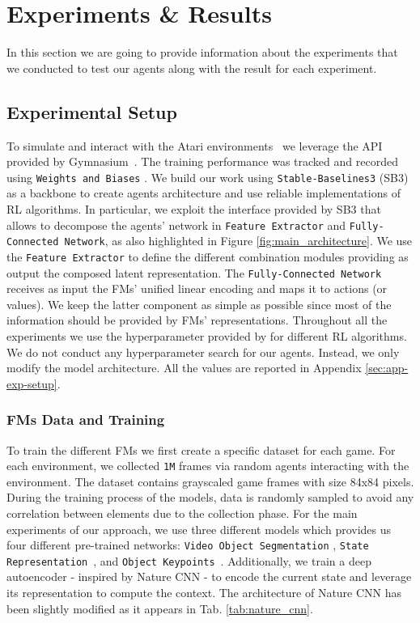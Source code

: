 
\chapter{Experiments \& Results}
\label{ch:experiments_and_results}
In this section we are going to provide information about the experiments that we conducted to test our agents along with the result for each experiment.


\section{Experimental Setup}\label{sec:exp_setup}
To simulate and interact with the Atari environments~\citep{bellemare2013atari} we leverage the API provided by Gymnasium~\citep{towers_gymnasium_2023}.
The training performance was tracked and recorded using \texttt{Weights and Biases} \citep{wandb}.
We build our work using \texttt{Stable-Baselines3} (SB3) \citep{stable-baselines3} as a backbone to create agents architecture and use reliable implementations of RL algorithms.
In particular, we exploit the interface provided by SB3 that allows to decompose the agents' network in \texttt{Feature Extractor} and \texttt{Fully-Connected Network}, as also highlighted in Figure \ref{fig:main_architecture}.
We use the \texttt{Feature Extractor} to define the different combination modules providing as output the composed latent representation.
The \texttt{Fully-Connected Network} receives as input the FMs' unified linear encoding and maps it to actions (or values).
We keep the latter component as simple as possible since most of the information should be provided by FMs' representations.
Throughout all the experiments we use the hyperparameter provided by \citet{rl-zoo3} for different RL algorithms.
We do not conduct any hyperparameter search for our agents.
Instead, we only modify the model architecture.
All the values are reported in Appendix \ref{sec:app-exp-setup}.

\subsection{FMs Data and Training}
To train the different FMs we first create a specific dataset for each game.
For each environment, we collected \texttt{1M} frames via random agents interacting with the environment.
The dataset contains grayscaled game frames with size 84x84 pixels.
During the training process of the models, data is randomly sampled to avoid any correlation between elements due to the collection phase.
For the main experiments of our approach, we use three different models which provides us four different pre-trained networks: \texttt{Video Object Segmentation} \citep{goel2018unsupervised}, \texttt{State Representation}~\citep{anand2019unsupervised}, and \texttt{Object Keypoints}~\citep{kulkarni2019unsupervised}.
Additionally, we train a deep autoencoder - inspired by Nature CNN \citep{mnih2015human} - to encode the current state and leverage its representation to compute the context.
The architecture of Nature CNN has been slightly modified as it appears in Tab. \ref{tab:nature_cnn}.

